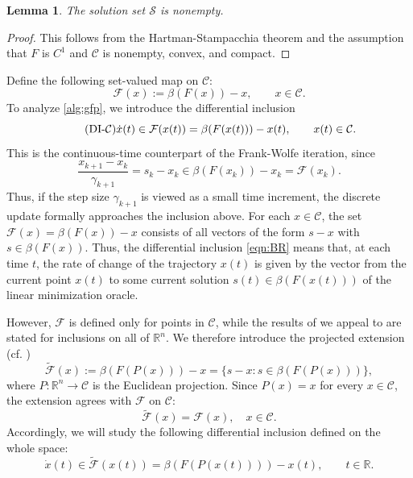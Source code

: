 \documentclass[pdflatex,sn-mathphys-num]{sn-jnl}%
\newcommand\R{\mathbb{R}}
\newcommand\C{\mathcal{C}}
\newcommand\mF{\mathcal{F}}
\newcommand\tmF{\widetilde{\mF}}
\newcommand\mS{\mathcal{S}}
\theoremstyle{thmstyleone}%
\newtheorem{lemma}[theorem]{Lemma}%
\theoremstyle{thmstyletwo}%
\theoremstyle{thmstylethree}%
\begin{document}
\begin{lemma} \label{lem:sol-nonempty}
   The solution set $\mS$ is nonempty.
\end{lemma}
\begin{proof}
  This follows from the Hartman-Stampacchia theorem \cite[Lemma~3.1]{Hartman1966} and the assumption that $F$ is $C^1$ and $\C$ is nonempty, convex, and compact.
\end{proof}

Define the following set-valued map on $\C$:
\[
  \mF(x) := \beta(F(x)) - x,\qquad x \in \C.
\]
To analyze \eqref{alg:gfp}, we introduce the differential inclusion
\begin{equation}\label{eqn:BR}\tag{DI-$\C$}
  \dot x(t)\in \mF(x(t)) = \beta(F(x(t))) - x(t),\qquad x(t) \in \C.
\end{equation}
This is the continuous-time counterpart of the Frank-Wolfe iteration, since
\[
  \frac{x_{k+1}-x_k}{\gamma_{k+1}} = s_k-x_k \in \beta(F(x_k)) - x_k = \mF(x_k).
\]
Thus, if the step size $\gamma_{k+1}$ is viewed as a small time increment, the discrete update formally approaches the inclusion above.
For each $x\in\C$, the set $\mF(x)=\beta(F(x))-x$ consists of all vectors of the form $s-x$ with $s\in\beta(F(x))$. Thus, the differential inclusion
\eqref{eqn:BR}
means that, at each time $t$, the rate of change of the trajectory $x(t)$ is given by the vector from the current point $x(t)$ to some current solution $s(t)\in \beta(F(x(t)))$ of the linear minimization oracle.

However, $\mF$ is defined only for points in $\C$, while the results of \cite{Benaim2005} we appeal to are stated for inclusions on all of $\R^n$. We therefore introduce the projected extension (cf. \cite[Remark~1.2]{Benaim2005})
\[
  \tmF(x) := \beta(F(P(x))) - x = \big\{s - x : s \in \beta(F(P(x)))\big\},
\]
where $P:\R^n\to\C$ is the Euclidean projection. Since $P(x)=x$ for every $x\in\C$, the extension agrees with $\mF$ on $\C$:
\[
  \tmF(x)=\mF(x),\quad x\in\C.
\]
Accordingly, we will study the following differential inclusion defined on the whole space:
\begin{equation} \label{prob:pdi} \tag{DI}
  \dot x(t)\in \tmF(x(t)) = \beta(F(P(x(t)))) - x(t), \qquad t \in \R.
\end{equation}
\end{document}
